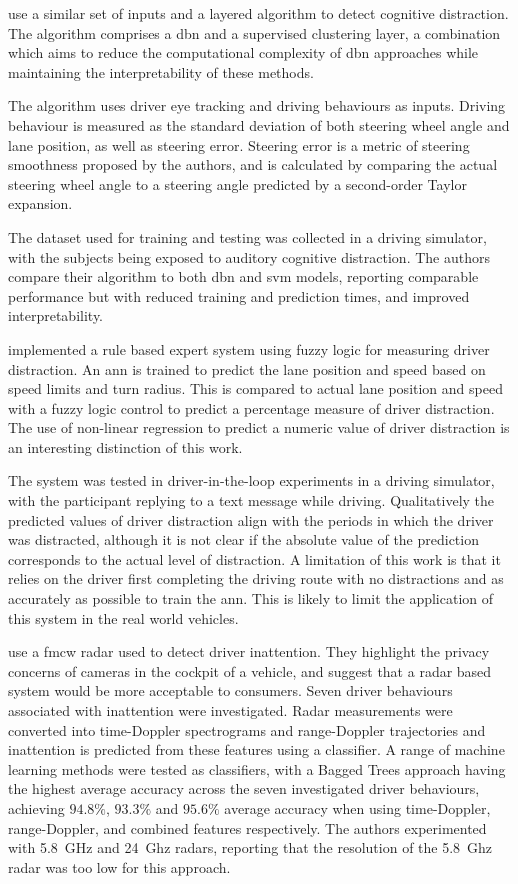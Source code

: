 \documentclass[11pt, parskip=half*,twoside=false]{scrbook}
\begin{document}
\citet{liangHybridBayesianNetwork2014} use a similar set of inputs and a layered algorithm to detect cognitive distraction. The algorithm comprises a \gls{dbn} and a supervised clustering layer, a combination which aims to reduce the computational complexity of \gls{dbn} approaches while maintaining the interpretability of these methods.

The algorithm uses driver eye tracking and driving behaviours as inputs. Driving behaviour is measured as the standard deviation of both steering wheel angle and lane position, as well as steering error. Steering error is a metric of steering smoothness proposed by the authors, and is calculated by comparing the actual steering wheel angle to a steering angle predicted by a second-order Taylor expansion. 

The dataset used for training and testing was collected in a driving simulator, with the subjects being exposed to auditory cognitive distraction. The authors compare their algorithm to both \gls{dbn} and \gls{svm} models, reporting comparable performance but with reduced training and prediction times, and improved interpretability.

\citet{aksjonovDetectionEvaluationDriver2019} implemented a rule based expert system using fuzzy logic for measuring driver distraction. An \gls{ann} is trained to predict the lane position and speed based on speed limits and turn radius. This is compared to actual lane position and speed with a fuzzy logic control to predict a percentage measure of driver distraction. The use of non-linear regression to predict a numeric value of driver distraction is an interesting distinction of this work.

The system was tested in driver-in-the-loop experiments in a driving simulator, with the participant replying to a text message while driving. Qualitatively the predicted values of driver distraction align with the periods in which the driver was distracted, although it is not clear if the absolute value of the prediction corresponds to the actual level of distraction. A limitation of this work is that it relies on the driver first completing the driving route with no distractions and as accurately as possible to train the \gls{ann}. This is likely to limit the application of this system in the real world vehicles.

 \citet{dingInattentiveDrivingBehavior2019} use a \gls{fmcw} radar used to detect driver inattention. They highlight the privacy concerns of cameras in the cockpit of a vehicle, and suggest that a radar based system would be more acceptable to consumers. Seven driver behaviours associated with inattention were investigated. Radar measurements were converted into time-Doppler spectrograms and range-Doppler trajectories and inattention is predicted from these features using a classifier. A range of machine learning methods were tested as classifiers, with a Bagged Trees approach having the highest average accuracy across the seven investigated driver behaviours, achieving $94.8\%$, $93.3\%$ and $95.6\%$ average accuracy when using time-Doppler, range-Doppler, and combined features respectively. The authors experimented with 5.8~GHz and 24~Ghz radars, reporting that the resolution of the 5.8~Ghz radar was too low for this approach.
 
\end{document}
